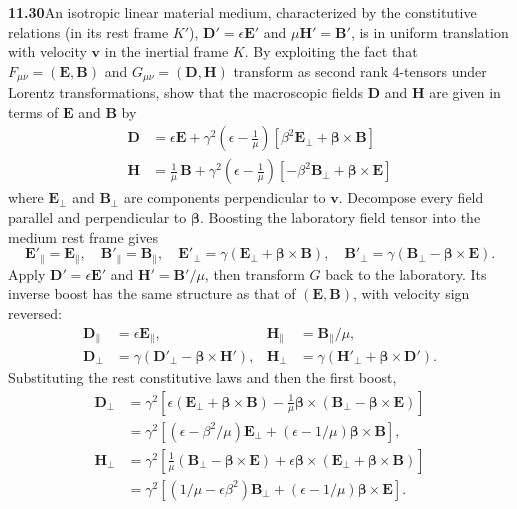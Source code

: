 \par\bigskip
\noindent\textbf{11.30}\quad An isotropic linear material medium, characterized by the constitutive relations (in its rest frame $K'$), $\mathbf{D}'=\epsilon\mathbf{E}'$ and $\mu\mathbf{H}'=\mathbf{B}'$, is in uniform translation with velocity $\mathbf{v}$ in the inertial frame $K$. By exploiting the fact that $F_{\mu\nu}=(\mathbf{E},\mathbf{B})$ and $G_{\mu\nu}=(\mathbf{D},\mathbf{H})$ transform as second rank 4-tensors under Lorentz transformations, show that the macroscopic fields $\mathbf{D}$ and $\mathbf{H}$ are given in terms of $\mathbf{E}$ and $\mathbf{B}$ by
\begin{align*}
\mathbf{D}&=\epsilon\mathbf{E}+\gamma^{2}\!\left(\epsilon-\frac{1}{\mu}\right)\![\beta^{2}\mathbf{E}_{\perp}+\boldsymbol{\beta}\times\mathbf{B}]\\[6pt]
\mathbf{H}&=\frac{1}{\mu}\,\mathbf{B}+\gamma^{2}\!\left(\epsilon-\frac{1}{\mu}\right)\![-\beta^{2}\mathbf{B}_{\perp}+\boldsymbol{\beta}\times\mathbf{E}]
\end{align*}
where $\mathbf{E}_{\perp}$ and $\mathbf{B}_{\perp}$ are components perpendicular to $\mathbf{v}$.
\solution
Decompose every field parallel and perpendicular to
$\boldsymbol\beta$. Boosting the laboratory field tensor into
the medium rest frame gives
\[
\mathbf E'_\parallel=\mathbf E_\parallel,\quad
\mathbf B'_\parallel=\mathbf B_\parallel,\quad
\mathbf E'_\perp=\gamma(\mathbf E_\perp+\boldsymbol\beta\times\mathbf B),
\quad
\mathbf B'_\perp=\gamma(\mathbf B_\perp-\boldsymbol\beta\times\mathbf E).
\]
Apply $\mathbf D'=\epsilon\mathbf E'$ and
$\mathbf H'=\mathbf B'/\mu$, then transform $G$ back to the
laboratory. Its inverse boost has the same structure as that of
$(\mathbf E,\mathbf B)$, with velocity sign reversed:
\begin{align*}
\mathbf D_\parallel&=\epsilon\mathbf E_\parallel,
&\mathbf H_\parallel&=\mathbf B_\parallel/\mu,\\
\mathbf D_\perp&=\gamma(\mathbf D'_\perp-\boldsymbol\beta\times\mathbf H'),
&\mathbf H_\perp&=\gamma(\mathbf H'_\perp+\boldsymbol\beta\times\mathbf D').
\end{align*}
Substituting the rest constitutive laws and then the first boost,
\begin{align*}
\mathbf D_\perp
&=\gamma^2\left[\epsilon(\mathbf E_\perp+\boldsymbol\beta\times\mathbf B)
-\frac1\mu\boldsymbol\beta\times
(\mathbf B_\perp-\boldsymbol\beta\times\mathbf E)\right]\\
&=\gamma^2\left[(\epsilon-\beta^2/\mu)\mathbf E_\perp
+(\epsilon-1/\mu)\boldsymbol\beta\times\mathbf B\right],\\
\mathbf H_\perp
&=\gamma^2\left[\frac1\mu(\mathbf B_\perp-\boldsymbol\beta\times\mathbf E)
+\epsilon\boldsymbol\beta\times
(\mathbf E_\perp+\boldsymbol\beta\times\mathbf B)\right]\\
&=\gamma^2\left[(1/\mu-\epsilon\beta^2)\mathbf B_\perp
+(\epsilon-1/\mu)\boldsymbol\beta\times\mathbf E\right].
\end{align*}
